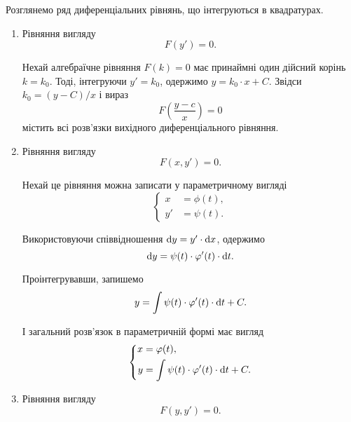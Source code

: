 Розглянемо ряд диференціальних рівнянь, що інтегруються в квадратурах.
\begin{enumerate}
	\item Рівняння вигляду 
	\begin{equation*}
		F(y') = 0.
	\end{equation*}

	Нехай алгебраїчне рівняння $F(k) = 0$ має принаймні один дійсний корінь $k = k_0$. Тоді, інтегруючи $y' = k_0$, одержимо $y = k_0 \cdot x + C$. Звідси $k_0 = (y - C) / x$ і вираз
	\begin{equation*}
		F \left( \frac{y - c}{x} \right) = 0	
	\end{equation*}
	містить всі розв'язки вихідного диференціального рівняння.

	\item Рівняння вигляду 
	\begin{equation*}
		F(x, y') = 0.
	\end{equation*}

	Нехай це рівняння можна записати у параметричному вигляді
	\begin{equation*}
		\left\{\begin{aligned}
			x &= \phi(t), \\
			y' &= \psi(t).
		\end{aligned}\right.
	\end{equation*}

	Використовуючи співвідношення $\mathop{}\!\mathrm{d} y = y ' \cdot \mathop{}\!\mathrm{d} x$, одержимо 
	\begin{equation*}
		\mathop{}\!\mathrm{d} y = \psi(t) \cdot \varphi'(t) \cdot \mathop{}\!\mathrm{d} t.
	\end{equation*}

	Проінтегрувавши, запишемо
	\begin{equation*}
		y = \int \psi(t) \cdot \varphi'(t) \cdot \mathop{}\!\mathrm{d} t + C.
	\end{equation*}

	І загальний розв'язок в параметричній формі має вигляд
	\begin{equation*}
		\left\{
			\begin{aligned}
				x &= \varphi(t), \\
				y &= \int \psi(t) \cdot \varphi'(t) \cdot \mathop{}\!\mathrm{d} t + C.
			\end{aligned}
		\right.
	\end{equation*}
	
	\item Рівняння вигляду 
	\begin{equation*}
		F(y, y') = 0.
	\end{equation*}


\end{enumerate}

